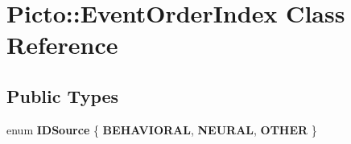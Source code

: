 \hypertarget{class_picto_1_1_event_order_index}{\section{Picto\-:\-:Event\-Order\-Index Class Reference}
\label{class_picto_1_1_event_order_index}
}
\subsection*{Public Types}
\begin{DoxyCompactItemize}
\item 
enum {\bfseries I\-D\-Source} \{ {\bfseries B\-E\-H\-A\-V\-I\-O\-R\-A\-L}, 
{\bfseries N\-E\-U\-R\-A\-L}, 
{\bfseries O\-T\-H\-E\-R}
 \}
\end{DoxyCompactItemize}
